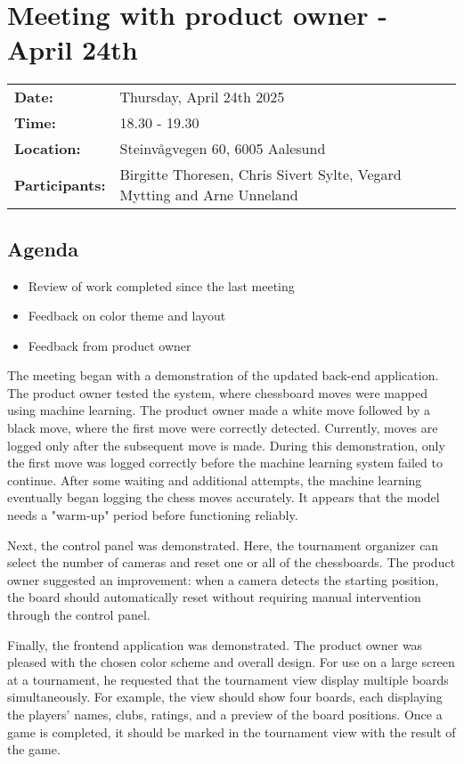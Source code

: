 \section{Meeting with product owner - April 24th}
\begin{tabular}{ll}
    \textbf{Date:} & Thursday, April 24th 2025 \\
    \textbf{Time:} & 18.30 - 19.30\\
    \textbf{Location:} & Steinvågvegen 60, 6005 Aalesund \\
    \textbf{Participants:} & Birgitte Thoresen, Chris Sivert Sylte, Vegard Mytting and Arne Unneland\\
\end{tabular}

\vspace{0.5cm}

\subsection{Agenda}

\begin{itemize} 
    \item Review of work completed since the last meeting
    \item Feedback on color theme and layout
    \item Feedback from product owner 
\end{itemize}

The meeting began with a demonstration of the updated back-end application. The product owner tested the system, where chessboard moves were mapped using machine learning. The product owner made a white move followed by a black move, where the first move were correctly detected. Currently, moves are logged only after the subsequent move is made. During this demonstration, only the first move was logged correctly before the machine learning system failed to continue. After some waiting and additional attempts, the machine learning eventually began logging the chess moves accurately. It appears that the model needs a "warm-up" period before functioning reliably.

Next, the control panel was demonstrated. Here, the tournament organizer can select the number of cameras and reset one or all of the chessboards. The product owner suggested an improvement: when a camera detects the starting position, the board should automatically reset without requiring manual intervention through the control panel. 

Finally, the frontend application was demonstrated. The product owner was pleased with the chosen color scheme and overall design. For use on a large screen at a tournament, he requested that the tournament view display multiple boards simultaneously. For example, the view should show four boards, each displaying the players' names, clubs, ratings, and a preview of the board positions. Once a game is completed, it should be marked in the tournament view with the result of the game.

